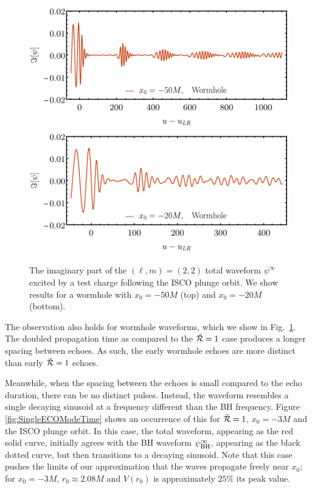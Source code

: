 \begin{refsection}
\begin{figure}[t]
\includegraphics[width = 1 \columnwidth]{chapter_echo/etc/xW50wormplot} \\
\includegraphics[width = 1 \columnwidth]{chapter_echo/etc/xW20wormplot} 
\caption{
The imaginary part of the $(\ell,m)=(2,2)$ total waveform $\psi^\infty$ excited by a test charge following the ISCO plunge orbit. We show results for a wormhole with $x_0=-50M$ (top) and $x_0=-20M$ (bottom).
}
\label{fig:EsumWormhole}
\end{figure}

The observation also holds for wormhole waveforms, which we show in Fig.~\ref{fig:EsumWormhole}.
The doubled propagation time as compared to the $\tilde{\mathcal R} = 1$ case produces a longer spacing between echoes.
As such, the early wormhole echoes are more distinct than early $\tilde{\mathcal R} =1$ echoes. 

Meanwhile, when the spacing between the echoes is small compared to the echo duration, there can be no distinct pulses. 
Instead, the waveform resembles a single decaying sinusoid at a frequency different than the BH frequency.
Figure \ref{fig:SingleECOModeTime} shows an occurrence of this for $\tilde{\mathcal R} =1$, $x_0=-3M$ and the ISCO plunge orbit.
In this case, the total waveform, appearing as the red solid curve, initially agrees with the BH waveform $\psi^\infty_{\rm BH}$, appearing as the black dotted curve, but then transitions to a decaying sinusoid. 
Note that this case pushes the limits of our approximation that the waves propagate freely near $x_0$; for $x_0 = -3M$, $r_0 \approx 2.08 M$ and $V(r_0)$ is approximately $25\%$ its peak value.


\end{refsection}

